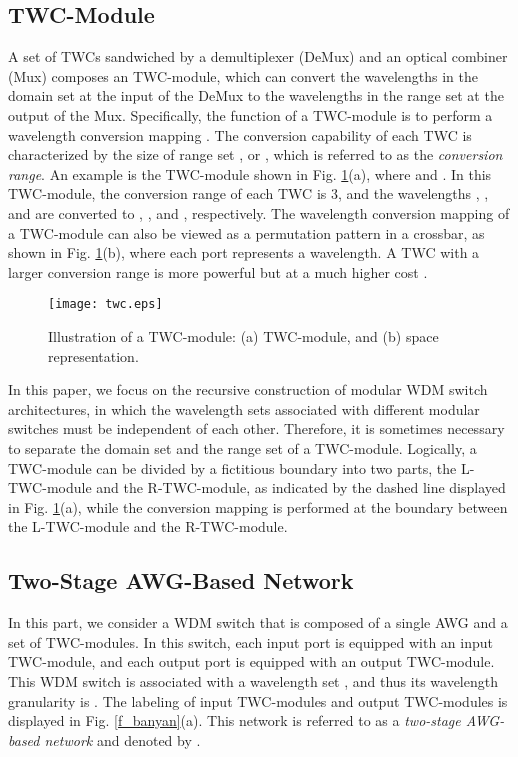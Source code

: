 \documentclass[journal]{IEEEtran}
\begin{document}
\subsection{TWC-Module}
A set of  TWCs sandwiched by a  demultiplexer (DeMux)
and an  optical combiner (Mux) composes an 
TWC-module, which can convert the wavelengths in the domain set
 at the input of the DeMux to the
wavelengths in the range set
 at the output of the Mux.
Specifically, the function of a TWC-module is to perform a
wavelength conversion mapping . The
conversion capability of each TWC is characterized by the size of
range set , or , which is referred to as the
\emph{conversion range}. An example is the  TWC-module
shown in Fig. \ref{f_twc}(a), where
 and
. In this TWC-module, the
conversion range of each TWC is 3, and the wavelengths ,
, and  are converted to , , and
, respectively. The wavelength conversion mapping of a
TWC-module can also be viewed as a permutation pattern in a
crossbar, as shown in Fig. \ref{f_twc}(b), where each port
represents a wavelength. A TWC with a larger conversion range is
more powerful but at a much higher cost
\cite{Pattavina:INFOCOM2006}.

\begin{figure}[t]
\centering
\texttt{[image: twc.eps]}
\caption{Illustration of a TWC-module: (a)  TWC-module,
and (b) space representation.}\label{f_twc}
\end{figure}

In this paper, we focus on the recursive construction of modular WDM
switch architectures, in which the wavelength sets associated with
different modular switches must be independent of each other.
Therefore, it is sometimes necessary to separate the domain set
 and the range set  of a TWC-module. Logically, a
TWC-module can be divided by a fictitious boundary into two parts,
the L-TWC-module and the R-TWC-module, as indicated by the dashed
line displayed in Fig. \ref{f_twc}(a), while the conversion mapping
 is performed at the boundary between the
L-TWC-module and the R-TWC-module.

\subsection{Two-Stage AWG-Based Network}
In this part, we consider a WDM switch that is composed of a single
 AWG and a set of TWC-modules. In this switch, each input
port is equipped with an  input TWC-module, and each
output port is equipped with an  output TWC-module. This
WDM switch is associated with a wavelength set
, and thus its
wavelength granularity is . The labeling of
 input TWC-modules and  output TWC-modules is displayed in
Fig. \ref{f_banyan}(a). This network is referred to as a
\emph{two-stage AWG-based network} and denoted by
.
\end{document}
